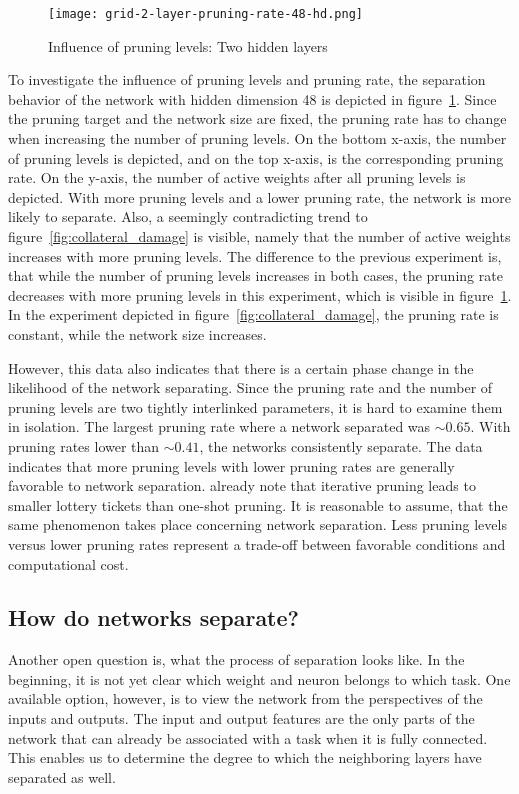 \begin{figure}[ht]
    \centering
    \texttt{[image: grid-2-layer-pruning-rate-48-hd.png]}
    \caption{Influence of pruning levels: Two hidden layers
    }\label{fig:grid-2}
\end{figure}

To investigate the influence of pruning levels and pruning rate, the separation behavior of the network with hidden dimension 48 is depicted in figure~\ref{fig:grid-2}.
Since the pruning target and the network size are fixed, the pruning rate has to change when increasing the number of pruning levels.
On the bottom x-axis, the number of pruning levels is depicted, and on the top x-axis, is the corresponding pruning rate.
On the y-axis, the number of active weights after all pruning levels is depicted.
With more pruning levels and a lower pruning rate, the network is more likely to separate.
Also, a seemingly contradicting trend to figure~\ref{fig:collateral_damage} is visible, namely that the number of active weights increases with more pruning levels.
The difference to the previous experiment is, that while the number of pruning levels increases in both cases, the pruning rate decreases with more pruning levels in this experiment, which is visible in figure~\ref{fig:grid-2}. In the experiment depicted in figure~\ref{fig:collateral_damage}, the pruning rate is constant, while the network size increases.

However, this data also indicates that there is a certain phase change in the likelihood of the network separating.
Since the pruning rate and the number of pruning levels are two tightly interlinked parameters, it is hard to examine them in isolation.
The largest pruning rate where a network separated was $\sim0.65$. 
With pruning rates lower than $\sim0.41$, the networks consistently separate.
The data indicates that more pruning levels with lower pruning rates are generally favorable to network separation.
\textcite{LTH} already note that iterative pruning leads to smaller lottery tickets than one-shot pruning.
It is reasonable to assume, that the same phenomenon takes place concerning network separation.
Less pruning levels versus lower pruning rates represent a trade-off between favorable conditions and computational cost.

\subsection{How do networks separate?}
Another open question is, what the process of separation looks like.
In the beginning, it is not yet clear which weight and neuron belongs to which task.
One available option, however, is to view the network from the perspectives of the inputs and outputs.
The input and output features are the only parts of the network that can already be associated with a task when it is fully connected.
This enables us to determine the degree to which the neighboring layers have separated as well.

